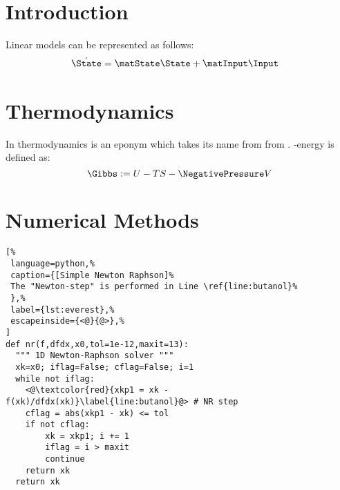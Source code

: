 \documentclass{my-memoir}
\begin{document}
%
\maketitle
%
%
\raggedcolumns
\begin{multicols}{2}
%
\tableofcontents
%
\mergeglossaries%
\printglossary[type=main, style=mylong2col, title=Symbols]
\printglossary[type=\acronymtype]
\section{Introduction}
%
Linear models can be represented as follows:
%
\begin{align}
  \dot{\State} &= \matState \State + \matInput \Input 
\end{align}
%
%
\section{Thermodynamics}
%
In thermodynamics \Gibbs is an eponym which takes its name from from . \Gibbs-energy is defined as:
%
\[
  \Gibbs := U - TS - \NegativePressure V
\]
\section{Numerical Methods}
%
\begin{lstlisting}[%
 language=python,%
 caption={[Simple Newton Raphson]%
 The "Newton-step" is performed in Line \ref{line:butanol}%
 },%
 label={lst:everest},%
 escapeinside={<@}{@>},%
]
def nr(f,dfdx,x0,tol=1e-12,maxit=13):
  """ 1D Newton-Raphson solver """
  xk=x0; iflag=False; cflag=False; i=1
  while not iflag:
    <@\textcolor{red}{xkp1 = xk - f(xk)/dfdx(xk)}\label{line:butanol}@> # NR step
    cflag = abs(xkp1 - xk) <= tol
    if not cflag:
        xk = xkp1; i += 1
        iflag = i > maxit
        continue
    return xk
  return xk
\end{lstlisting}
%
\end{multicols}
%
\clearpage
%
\twocolindex
\printindex
%
\end{document}
